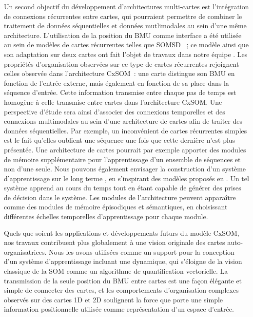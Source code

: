 Un second objectif du développement d'architectures multi-cartes est l'intégration de connexions récurrentes entre cartes, qui pourraient permettre de combiner le traitement de données séquentielles et données mutlimodales au sein d'une même architecture.
L'utilisation de la position du BMU comme interface a été utilisée au sein de modèles de cartes récurrentes telles que SOMSD \parencite{hagenbuchner_self-organizing_2003}~; ce modèle ainsi que son adaptation sur deux cartes ont fait l'objet de travaux dans notre équipe \parencite{baheux_towards_2014, fix20}. 
Les propriétés d'organisation observées sur ce type de cartes récurrentes rejoignent celles observée dans l'architecture CxSOM~: une carte distingue son BMU en fonction de l'entrée externe, mais également en fonction de sa place dans la séquence d'entrée. Cette information transmise entre chaque pas de temps est homogène à celle transmise entre cartes dans l'architecture CxSOM.
Une perspective d'étude sera ainsi d'associer des connexions temporelles et des connexions multimodales au sein d'une architecture de cartes afin de traiter des données séquentielles.
Par exemple, un inconvénient de cartes récurrentes simples est le fait qu'elles oublient une séquence une fois que cette dernière n'est plus présentée. Une architecture de cartes pourrait par exemple apporter des modules de mémoire supplémentaire pour l'apprentissage d'un ensemble de séquences et non d'une seule.
Nous pouvons également envisager la construction d'un système d'apprentissage \og sur le long terme \fg{}, en s'inspirant des modèles proposés en \cite{parisiLL,parisi17}. Un tel système apprend au cours du temps tout en étant capable de générer des prises de décision dans le système. Les modules de l'architecture peuvent apparaître comme des modules de mémoire épisodiques et sémantiques, en choisissant différentes échelles temporelles d'apprentissage pour chaque module.


Quels que soient les applications et développements futurs du modèle CxSOM, nos travaux contribuent plus globalement à une vision originale des cartes auto-organisatrices. Nous les avons utilisées comme un support pour la conception d'un système d'apprentissage incluant une dynamique, qui s'éloigne de la vision classique de la SOM comme un algorithme de quantification vectorielle.
La transmission de la seule position du BMU entre cartes est une façon élégante et simple de connecter des cartes, et les comportements d'organisation complexes observés sur des cartes 1D et 2D soulignent la force que porte une simple information positionnelle utilisée comme représentation d'un espace d'entrée.



